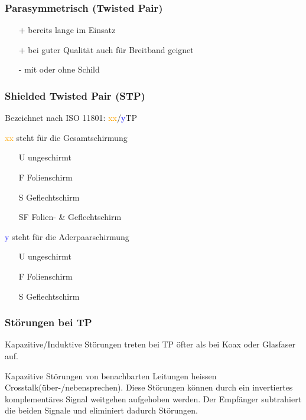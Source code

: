 \subsubsection{Parasymmetrisch (Twisted Pair)}
\begin{itemize}
    \item[+] bereits lange im Einsatz
    \item[+] bei guter Qualität auch für Breitband geignet
    \item[-] mit oder ohne Schild
\end{itemize}

\subsubsection{Shielded Twisted Pair (STP)}

Bezeichnet nach ISO 11801: \textcolor{orange}{xx}/\textcolor{blue}{y}TP

\begin{multicols}{2}
    \textcolor{orange}{xx} steht für die Gesamtschirmung
    \begin{itemize}
        \item[U] ungeschirmt
        \item[F] Folienschirm
        \item[S] Geflechtschirm
        \item[SF] Folien- \& Geflechtschirm
    \end{itemize}

    \columnbreak

    \textcolor{blue}{y} steht für die Aderpaarschirmung
    \begin{itemize}
        \item[U] ungeschirmt
        \item[F] Folienschirm
        \item[S] Geflechtschirm
    \end{itemize}
\end{multicols}


\subsubsection{Störungen bei TP}

Kapazitive/Induktive Störungen treten bei TP öfter als bei Koax oder Glasfaser auf.

Kapazitive Störungen von benachbarten Leitungen heissen Crosstalk(über-/nebensprechen).
Diese Störungen können durch ein invertiertes komplementäres Signal weitgehen aufgehoben werden.
Der Empfänger subtrahiert die beiden Signale und eliminiert dadurch Störungen.

